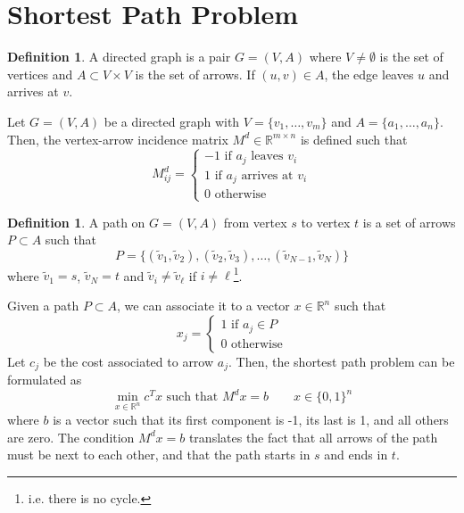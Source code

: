 \documentclass[12pt, openany]{report}
\newcommand{\R}{\mathbb{R}}
\theoremstyle{definition}
\newtheorem{definition}[thm]{Definition}
\begin{document}
\section{Shortest Path Problem}
\begin{definition}
    A directed graph is a pair \(G=(V,A)\) where \(V\neq \emptyset\) is the set of vertices and \(A\subset V\times V\) is the set of arrows. If \((u,v)\in A\), the edge leaves \(u\) and arrives at \(v\).
\end{definition}
Let \(G=(V,A)\) be a directed graph with \(V=\{v_1,\dots,v_m\}\) and \(A=\{a_1,\dots,a_n\}\). Then, the vertex-arrow incidence matrix \(M^d\in \R^{m\times n}\) is defined such that 
\begin{equation}
    M_{ij}^d = \begin{cases}
        -1 \text{ if }a_j \text{ leaves }v_i\\
        1 \text{ if }a_j \text{ arrives at }v_i\\
        0 \text{ otherwise}
    \end{cases}
\end{equation}
\begin{definition}
    A path on \(G=(V,A)\) from vertex \(s\) to vertex \(t\) is a set of arrows \(P\subset A\) such that 
    \begin{equation}
        P=\{(\tilde v_1,\tilde v_2), (\tilde v_2,\tilde v_3), \dots, (\tilde v_{N-1},\tilde v_N)\}
    \end{equation}
    where \(\tilde v_1= s\), \(\tilde v_N=t\) and \(\tilde v_i\neq \tilde v_\ell\) if \(i\neq \ell\)\footnote{i.e. there is no cycle.}.
\end{definition}
Given a path \(P\subset A\), we can associate it to a vector \(x\in \R^n\) such that 
\begin{equation}
    x_j=\begin{cases}
        1\text{ if }a_j\in P\\
        0\text{ otherwise}
    \end{cases}
\end{equation}
Let \(c_j\) be the cost associated to arrow \(a_j\). Then, the shortest path problem can be formulated as 
\begin{equation}\label{eq:spp}
    \min_{x\in \R^n}c^Tx \text{   such that   }M^dx=b\qquad x\in \{0,1\}^n
\end{equation}
where \(b\) is a vector such that its first component is -1, its last is 1, and all others are zero. The condition \(M^dx=b\) translates the fact that all arrows of the path must be next to each other, and that the path starts in \(s\) and ends in \(t\). 
\end{document}
